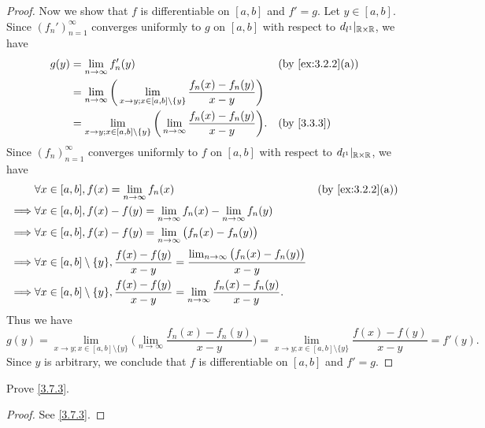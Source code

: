 \begin{proof}
  Now we show that \(f\) is differentiable on \([a, b]\) and \(f' = g\).
  Let \(y \in [a, b]\).
  Since \((f_n')_{n = 1}^\infty\) converges uniformly to \(g\) on \([a, b]\) with respect to \(d_{l^1}|_{\mathbb{R} \times \mathbb{R}}\), we have
  \begin{align*}
    g(y) & = \lim_{n \to \infty} f_n'(y)                                                                                   &  & \text{(by \cref{ex:3.2.2}(a))} \\
         & = \lim_{n \to \infty} \bigg(\lim_{x \to y ; x \in [a, b] \setminus \{y\}} \dfrac{f_n(x) - f_n(y)}{x - y}\bigg)                                      \\
         & = \lim_{x \to y ; x \in [a, b] \setminus \{y\}} \bigg(\lim_{n \to \infty} \dfrac{f_n(x) - f_n(y)}{x - y}\bigg). &  & \by{3.3.3}
  \end{align*}
  Since \((f_n)_{n = 1}^\infty\) converges uniformly to \(f\) on \([a, b]\) with respect to \(d_{l^1}|_{\mathbb{R} \times \mathbb{R}}\), we have
  \begin{align*}
             & \forall x \in [a, b], f(x) = \lim_{n \to \infty} f_n(x)                                                                         &  & \text{(by \cref{ex:3.2.2}(a))} \\
    \implies & \forall x \in [a, b], f(x) - f(y) = \lim_{n \to \infty} f_n(x) - \lim_{n \to \infty} f_n(y)                                                                         \\
    \implies & \forall x \in [a, b], f(x) - f(y) = \lim_{n \to \infty} \big(f_n(x) - f_n(y)\big)                                                                                   \\
    \implies & \forall x \in [a, b] \setminus \{y\}, \dfrac{f(x) - f(y)}{x - y} = \dfrac{\lim_{n \to \infty} \big(f_n(x) - f_n(y)\big)}{x - y}                                     \\
    \implies & \forall x \in [a, b] \setminus \{y\}, \dfrac{f(x) - f(y)}{x - y} = \lim_{n \to \infty} \dfrac{f_n(x) - f_n(y)}{x - y}.
  \end{align*}
  Thus we have
  \[
    g(y) = \lim_{x \to y ; x \in [a, b] \setminus \{y\}} \bigg(\lim_{n \to \infty} \dfrac{f_n(x) - f_n(y)}{x - y}\bigg) = \lim_{x \to y ; x \in [a, b] \setminus \{y\}} \dfrac{f(x) - f(y)}{x - y} = f'(y).
  \]
  Since \(y\) is arbitrary, we conclude that \(f\) is differentiable on \([a, b]\) and \(f' = g\).
\end{proof}

\begin{ex}\label{ex:3.7.3}
  Prove \cref{3.7.3}.
\end{ex}

\begin{proof}
  See \cref{3.7.3}.
\end{proof}